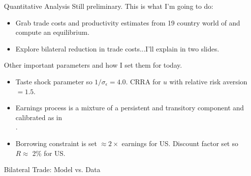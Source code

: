\documentclass[9pt,pdftex,aspectratio=1610]{beamer}
\theoremstyle{definition}
\begin{document}

\begin{frame}[t]{Quantitative Analysis}
\smallskip
Still preliminary. This is what I'm going to do:
\begin{itemize}
  \item Grab trade costs and productivity estimates from 19 country world of \citet{eaton2002technology} and compute an equilibrium.
\smallskip
  \item Explore bilateral reduction in trade costs...I'll explain in two slides.
\end{itemize}
\bigskip
Other important parameters and how I set them for today.
\begin{itemize}
\item Taste shock parameter so $1 / \sigma_{\epsilon} = 4.0$. CRRA for $u$ with relative risk aversion $= 1.5$.
\smallskip
\item Earnings process is a mixture of a persistent and transitory component and calibrated as in\\ \citet*{krueger2016macroeconomics}.
\smallskip
\item Borrowing constraint is set $\approx 2\times$ earnings for US. Discount factor set so $R \approx$ 2\% for US.
\end{itemize}
\end{frame}

\begin{frame}[t]{Bilateral Trade: Model vs. Data}
\begin{figure}[!t]
\end{figure}
\end{frame}
\end{document}
